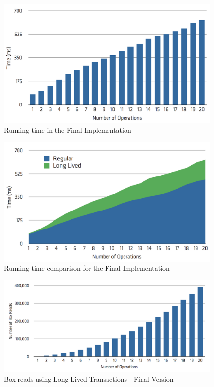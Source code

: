 \documentclass{llncs}
\begin{document}
\begin{figure}
\centering
\includegraphics[width=0.9\linewidth]{time-long-final}
\caption{Running time in the Final Implementation}
\label{fig:runtimeFinal}
\end{figure}

\begin{figure}
\centering
\includegraphics[width=0.9\linewidth]{comparison-final}
\caption{Running time comparison for the Final Implementation}
\label{fig:comparisonFinal}
\end{figure}


\begin{figure}
\centering
\includegraphics[width=0.9\linewidth]{box-long-final}
\caption{Box reads using Long Lived Transactions - Final Version}
\label{fig:boxesFinal}
\end{figure}
\end{document}
